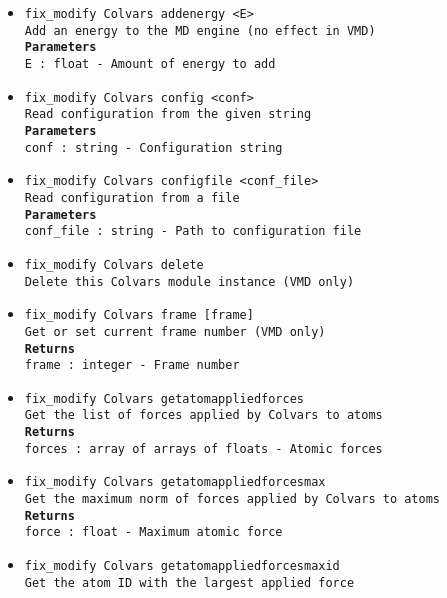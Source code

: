 \begin{itemize}
\item \texttt{fix\_modify Colvars addenergy <E>}
\\
\texttt{Add an energy to the MD engine (no effect in VMD)}
\\
\texttt{\textbf{Parameters}}
\\
\texttt{E : float - Amount of energy to add}
\item \texttt{fix\_modify Colvars config <conf>}
\\
\texttt{Read configuration from the given string}
\\
\texttt{\textbf{Parameters}}
\\
\texttt{conf : string - Configuration string}
\item \texttt{fix\_modify Colvars configfile <conf\_file>}
\\
\texttt{Read configuration from a file}
\\
\texttt{\textbf{Parameters}}
\\
\texttt{conf\_file : string - Path to configuration file}
\item \texttt{fix\_modify Colvars delete}
\\
\texttt{Delete this Colvars module instance (VMD only)}
\item \texttt{fix\_modify Colvars frame [frame]}
\\
\texttt{Get or set current frame number (VMD only)}
\\
\texttt{\textbf{Returns}}
\\
\texttt{frame : integer - Frame number}
\item \texttt{fix\_modify Colvars getatomappliedforces}
\\
\texttt{Get the list of forces applied by Colvars to atoms}
\\
\texttt{\textbf{Returns}}
\\
\texttt{forces : array of arrays of floats - Atomic forces}
\item \texttt{fix\_modify Colvars getatomappliedforcesmax}
\\
\texttt{Get the maximum norm of forces applied by Colvars to atoms}
\\
\texttt{\textbf{Returns}}
\\
\texttt{force : float - Maximum atomic force}
\item \texttt{fix\_modify Colvars getatomappliedforcesmaxid}
\\
\texttt{Get the atom ID with the largest applied force}

\end{itemize}
